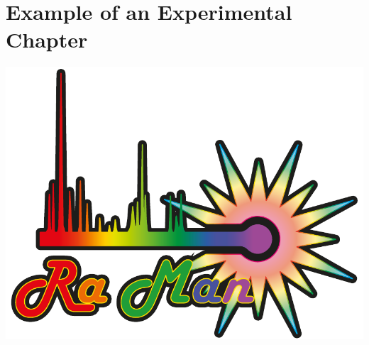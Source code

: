 \documentclass[main_brownies.tex]{subfiles}
\begin{document}
\graphicspath{ {Figures/}{Schemes/} } %
{}%

\checkoddpage
\ifoddpage
	\newpage\thispagestyle{empty}
	\mbox{}
	\newpage
	
\else
	
\fi


\chapter[Example Experimental Chapter]{Example of an Experimental Chapter} %

\begin{center}
	\begin{minipage}[htb]{.75\textwidth}
		\centering
		\includegraphics[width=\textwidth]{titlepageimage/Chapter_2_titlepageimage} %
	\end{minipage}
\end{center}

\begin{abstract}
	\Blindtext[1][3]
\end{abstract}
\end{document}
